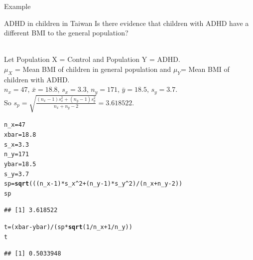 \documentclass[t,xcolor=pdftex,dvipsnames,table]{beamer}
\makeatletter
\newcommand{\hlnum}[1]{\textcolor[rgb]{0.686,0.059,0.569}{#1}}%
\newcommand{\hlopt}[1]{\textcolor[rgb]{0,0,0}{#1}}%
\newcommand{\hlstd}[1]{\textcolor[rgb]{0.345,0.345,0.345}{#1}}%
\newcommand{\hlkwb}[1]{\textcolor[rgb]{0.69,0.353,0.396}{#1}}%
\newcommand{\hlkwd}[1]{\textcolor[rgb]{0.737,0.353,0.396}{\textbf{#1}}}%
\newenvironment{kframe}{%
 \def\at@end@of@kframe{}%
 \ifinner\ifhmode%
  \def\at@end@of@kframe{\end{minipage}}%
  \begin{minipage}{\columnwidth}%
 \fi\fi%
 \def\FrameCommand##1{\hskip\@totalleftmargin \hskip-\fboxsep
 \colorbox{shadecolor}{##1}\hskip-\fboxsep
     \hskip-\linewidth \hskip-\@totalleftmargin \hskip\columnwidth}%
 \MakeFramed {\advance\hsize-\width
   \@totalleftmargin\z@ \linewidth\hsize
   \@setminipage}}%
 {\par\unskip\endMakeFramed%
 \at@end@of@kframe}
\newenvironment{knitrout}{}{} %
\makeatother
\begin{document}
\begin{frame}[fragile]{Example}

\begin{block}{ADHD in children in Taiwan}
Is there evidence that children with ADHD have a different BMI to the general population?
\end{block}

\vspace{.5cm}
  \\
Let Population X = Control and Population Y = ADHD. \\
$\mu_{X}$ = Mean BMI of children in general population and $\mu_{Y}$= Mean BMI of children with ADHD. \\
$n_{x} = 47$, $\bar{x} = 18.8$, $s_{x} = 3.3$, $n_{y} = 171$, $\bar{y} = 18.5$, $s_{y} = 3.7$. \\
So $s_{p} = \sqrt{  \frac{ (n_{x}-1) s_{x}^2 +  (n_{y}-1) s_{y}^2 }{n_{x} + n_{y} -2}  } = 3.618522$.

\end{frame}



\begin{frame}[fragile]{}

\begin{knitrout}
\color{fgcolor}\begin{kframe}
\begin{alltt}
\hlstd{n_x}\hlkwb{=} \hlnum{47}
\hlstd{xbar}\hlkwb{=}\hlnum{18.8}
\hlstd{s_x}\hlkwb{=}\hlnum{3.3}
\hlstd{n_y}\hlkwb{=}\hlnum{171}
\hlstd{ybar}\hlkwb{=}\hlnum{18.5}
\hlstd{s_y}\hlkwb{=}\hlnum{3.7}
\hlstd{sp} \hlkwb{=} \hlkwd{sqrt}\hlstd{( ((n_x}\hlopt{-}\hlnum{1}\hlstd{)}\hlopt{*}\hlstd{s_x}\hlopt{^}\hlnum{2} \hlopt{+} \hlstd{(n_y}\hlopt{-}\hlnum{1}\hlstd{)}\hlopt{*}\hlstd{s_y}\hlopt{^}\hlnum{2}\hlstd{)}\hlopt{/}\hlstd{(n_x}\hlopt{+}\hlstd{n_y}\hlopt{-}\hlnum{2}\hlstd{) )}
\hlstd{sp}
\end{alltt}
\begin{verbatim}
## [1] 3.618522
\end{verbatim}
\begin{alltt}
\hlstd{t} \hlkwb{=} \hlstd{(xbar}\hlopt{-}\hlstd{ybar)}\hlopt{/}\hlstd{(sp}\hlopt{*}\hlkwd{sqrt}\hlstd{(}\hlnum{1}\hlopt{/}\hlstd{n_x} \hlopt{+} \hlnum{1}\hlopt{/}\hlstd{n_y))}
\hlstd{t}
\end{alltt}
\begin{verbatim}
## [1] 0.5033948
\end{verbatim}
\end{kframe}
\end{knitrout}
\end{frame}  
\end{document}
